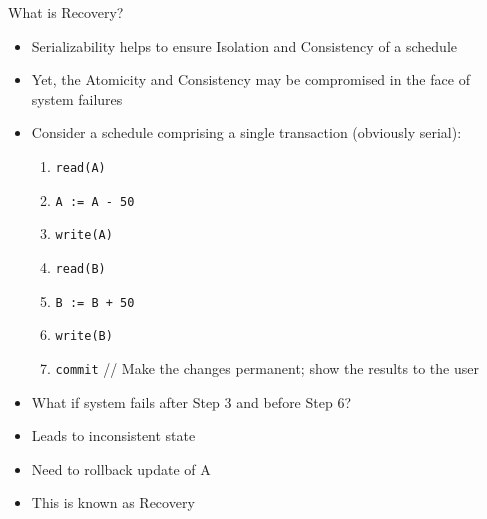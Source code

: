 \documentclass[aspectratio=169, xcolor=dvipsnames]{beamer}
\begin{document}
\begin{frame}{What is Recovery?}
    \begin{itemize}[<+->]
        \item Serializability helps to ensure Isolation and Consistency of a schedule
        \item Yet, the Atomicity and Consistency may be compromised in the face of system failures
        \item Consider a schedule comprising a single transaction (obviously serial):
        \begin{enumerate}
            \item \texttt{read(A)}
            \item \texttt{A := A - 50}
            \item \texttt{write(A)}
            \item \texttt{read(B)}
            \item \texttt{B := B + 50}
            \item \texttt{write(B)}
            \item \texttt{commit} // Make the changes permanent; show the results to the user
        \end{enumerate}
        \item What if system fails after Step 3 and before Step 6?
        \item Leads to inconsistent state
        \item Need to rollback update of A
        \item This is known as Recovery
    \end{itemize}
\end{frame}
\end{document}
